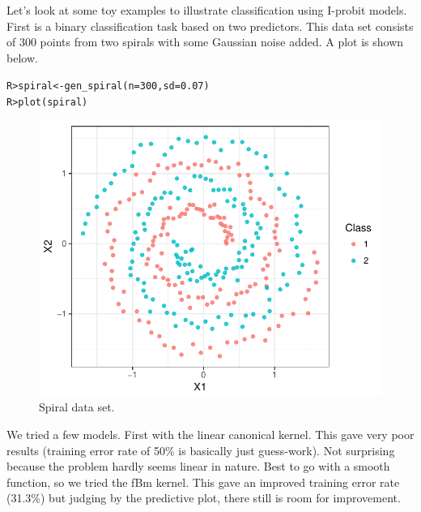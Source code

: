 \documentclass[a4paper,showframe,11pt]{report}\usepackage[]{graphicx}\usepackage[]{color}
\makeatletter
\newcommand{\hlnum}[1]{\textcolor[rgb]{0.063,0.58,0.627}{#1}}%
\newcommand{\hlstd}[1]{\textcolor[rgb]{0.196,0.196,0.196}{#1}}%
\newcommand{\hlkwb}[1]{\textcolor[rgb]{0.627,0,0.314}{#1}}%
\newcommand{\hlkwc}[1]{\textcolor[rgb]{0,0.631,0.314}{#1}}%
\newcommand{\hlkwd}[1]{\textcolor[rgb]{0.78,0.227,0.412}{#1}}%
\newenvironment{kframe}{%
 \def\at@end@of@kframe{}%
 \ifinner\ifhmode%
  \def\at@end@of@kframe{\end{minipage}}%
  \begin{minipage}{\columnwidth}%
 \fi\fi%
 \def\FrameCommand##1{\hskip\@totalleftmargin \hskip-\fboxsep
 \colorbox{shadecolor}{##1}\hskip-\fboxsep
     \hskip-\linewidth \hskip-\@totalleftmargin \hskip\columnwidth}%
 \MakeFramed {\advance\hsize-\width
   \@totalleftmargin\z@ \linewidth\hsize
   \@setminipage}}%
 {\par\unskip\endMakeFramed%
 \at@end@of@kframe}
\newenvironment{knitrout}{}{} %
\makeatother
\begin{document}
Let's look at some toy examples to illustrate classification using I-probit models. First is a binary classification task based on two predictors. This data set consists of 300 points from two spirals with some Gaussian noise added. A plot is shown below.

\begin{knitrout}
\color{fgcolor}\begin{kframe}
\begin{alltt}
\hlstd{R> }\hlstd{spiral} \hlkwb{<-} \hlkwd{gen_spiral}\hlstd{(}\hlkwc{n} \hlstd{=} \hlnum{300}\hlstd{,} \hlkwc{sd} \hlstd{=} \hlnum{0.07}\hlstd{)}
\hlstd{R> }\hlkwd{plot}\hlstd{(spiral)}
\end{alltt}
\end{kframe}\begin{figure}[h]

{\centering \includegraphics[width=0.7\linewidth]{figure/spiral_data-1} 

}

\caption[Spiral data set]{Spiral data set.}\label{fig:spiral_data}
\end{figure}


\end{knitrout}

We tried a few models. First with the linear canonical kernel. This gave very poor results (training error rate of 50\% is basically just guess-work). Not surprising because the problem hardly seems linear in nature. Best to go with a smooth function, so we tried the fBm kernel. This gave an improved training error rate (31.3\%) but judging by the predictive plot, there still is room for improvement.
\end{document}

